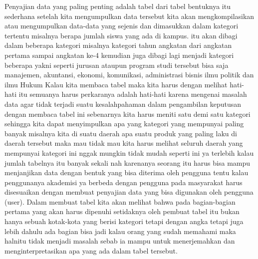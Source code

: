 \documentclass[
]{book}
\theoremstyle{definition}
\theoremstyle{definition}
\theoremstyle{definition}
\theoremstyle{definition}
\theoremstyle{remark}
\begin{document}
Penyajian data yang paling penting adalah tabel dari tabel bentuknya itu sederhana setelah kita mengumpulkan data tersebut kita akan mengkompilasikan atau mengumpulkan data-data yang sejenis dan dimasukkan dalam kategori tertentu misalnya berapa jumlah siswa yang ada di kampus. itu akan dibagi dalam beberapa kategori misalnya kategori tahun angkatan dari angkatan pertama sampai angkatan ke-4 kemudian juga dibagi lagi menjadi kategori beberapa yakni seperti jurusan ataupun program studi tersebut bisa saja manajemen, akuntansi, ekonomi, komunikasi, administrasi bisnis ilmu politik dan ilmu Hukum
Kalau kita membaca tabel maka kita harus dengan melihat hati-hati itu semuanya harus perkaranya adalah hati-hati karena mengenai masalah data agar tidak terjadi suatu kesalahpahaman dalam pengambilan keputusan dengan membaca tabel ini sebenarnya kita harus meniti satu demi satu kategori sehingga kita dapat menyimpulkan apa yang kategori yang mempunyai paling banyak misalnya kita di suatu daerah apa suatu produk yang paling laku di daerah tersebut maka mau tidak mau kita harus melihat seluruh daerah yang mempunyai kategori ini nggak mungkin tidak mudah seperti ini ya terlebih kalau jumlah tabelnya itu banyak sekali nah karenanya seorang itu harus bisa mampu menjanjikan data dengan bentuk yang bisa diterima oleh pengguna tentu kalau penggunanya akademisi ya berbeda dengan pengguna pada masyarakat harus disesuaikan dengan membuat penyajian data yang bisa digunakan oleh pengguna (user).
Dalam membuat tabel kita akan melihat bahwa pada bagian-bagian pertama yang akan harus dipenuhi setidaknya oleh pembuat tabel itu bukan hanya sebuah kotak-kota yang berisi kategori tetapi dengan angka tetapi juga lebih dahulu ada bagian bisa jadi kalau orang yang sudah memahami maka halnitu tidak menjadi masalah sebab ia mampu untuk menerjemahkan dan menginterpretasikan apa yang ada dalam tabel tersebut.
\end{document}
